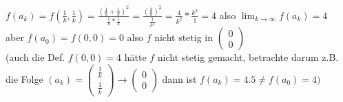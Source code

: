 \documentclass[a4paper,11pt]{article}
\begin{document}
\begin{enumerate}[label=\alph*)]
	$f(a_k)=f(\frac{1}{k},\frac{1}{k})=\frac{(\frac{1}{k}+\frac{1}{k})^2}{\frac{1}{k}*\frac{1}{k}}=\frac{(\frac{2}{k})^2}{\frac{1}{k^2}}=\frac{4}{k^2}*\frac{k^2}{1}=4$ also $\lim_{k\to\infty}f(a_k)=4$ \\
	aber $f(a_0)=f(0,0)=0$ also $f$ nicht stetig in $\begin{pmatrix}0\\0\end{pmatrix}$ \\
	(auch die Def. $f(0,0)=4$ hätte $f$ nicht stetig gemacht, betrachte darum z.B. die Folge $(a_k)=\begin{pmatrix}\frac{1}{k}\\\frac{1}{k}\end{pmatrix}\to\begin{pmatrix}0\\0\end{pmatrix}$ dann ist $f(a_k)=4.5\neq f(a_0)=4)$
\end{enumerate}
\end{document}
